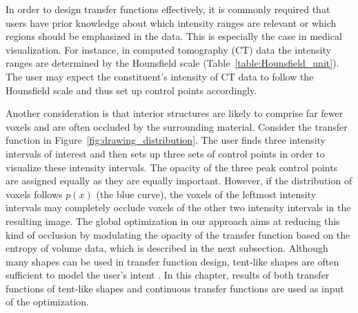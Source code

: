 In order to design transfer functions effectively, it is commonly required that users have prior knowledge about which intensity ranges are relevant or which regions should be emphasized in the data. This is especially the case in medical visualization. For instance, in computed tomography (CT) data the intensity ranges are determined by the Hounsfield scale (Table~\ref{table:Hounsfield_unit}). The user may expect the constituent's intensity of CT data to follow the Hounsfield scale and thus set up control points accordingly.

Another consideration is that interior structures are likely to comprise far fewer voxels and are often occluded by the surrounding material.
Consider the transfer function in Figure~\ref{fig:drawing_distribution}. The user finds three intensity intervals of interest and then sets up three sets of control points in order to visualize these intensity intervals. The opacity of the three peak control points are assigned equally as they are equally important.
However, if the distribution of voxels follows $ p(x) $ (the blue curve), the voxels of the leftmost intensity intervals may completely occlude voxels of the other two intensity intervals in the resulting image.
The global optimization in our approach aims at reducing this kind of occlusion by modulating the opacity of the transfer function based on the entropy of volume data, which is described in the next subsection.
Although many shapes can be used in transfer function design, tent-like shapes are often sufficient to model the user's intent \cite{konig_mastering_2000}. In this chapter, results of both transfer functions of tent-like shapes and continuous transfer functions are used as input of the optimization.

